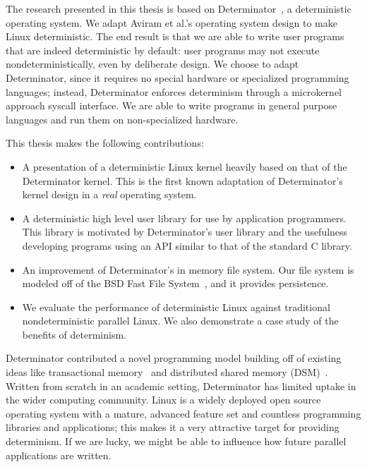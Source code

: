 The research presented in this thesis is based on Determinator~\cite{Aviram10},
a deterministic operating system. We adapt Aviram et al.'s operating system
design to make Linux deterministic. The end result is that we are able to write
user programs that are indeed deterministic by default: user programs may not
execute nondeterministically, even by deliberate design. We choose to adapt
Determinator, since it requires no special hardware or specialized programming
languages; instead, Determinator enforces determinism through a microkernel
approach syscall interface. We are able to write programs in general purpose
languages and run them on non-specialized hardware.

This thesis makes the following contributions:

\begin{itemize}
    \item A presentation of a deterministic Linux kernel heavily based on that
    of the Determinator kernel. This is the first known adaptation of
    Determinator's kernel design in a \emph{real} operating system.
    \item A deterministic high level user library for use by application
    programmers. This library is motivated by Determinator's user library and
    the usefulness developing programs using an API similar to that of the
    standard C library.
    \item An improvement of Determinator's in memory file system. Our file
    system is modeled off of the BSD Fast File System~\cite{mckusick1984fast},
    and it provides persistence.
    \item We evaluate the performance of deterministic Linux against traditional
    nondeterministic parallel Linux. We also demonstrate a case study of the
    benefits of determinism.
\end{itemize}

\iffalse
This thesis also presents an accompanying
user level C library, akin to the library utilities discussed by Aviram et al.
This user library is intended to simplify writing user programs in C using
familiar high level abstractions such as fork-join. We also provide an in memory
file system, improving upon Arivam et al.'s in memory file system design.
\fi

Determinator contributed a novel programming model building off of existing
ideas like transactional memory~\cite{herlihy1993transactional} and distributed
shared memory (DSM)~\cite{amza1996treadmarks}. Written from scratch in an
academic setting, Determinator has limited uptake in the wider computing
community. Linux is a widely deployed open source operating system with a
mature, advanced feature set and countless programming libraries and
applications; this makes it a very attractive target for providing determinism.
If we are lucky, we might be able to influence how future parallel applications
are written.

